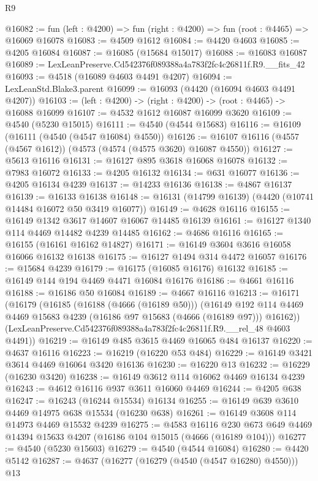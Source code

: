 \begin{lexlean}{R9}
\begin{coremodule}
@16082 := fun (left : @4200) => fun (right : @4200) => fun (root : @4465) => @16069 @16078
@16083 := @4509 @1612
@16084 := @4420 @4603
@16085 := @4205 @16084
@16087 := @16085 (@15684 @15017)
@16088 := @16083 @16087
@16089 := LexLeanPreserve.Cd542376f089388a4a783f2fc4c26811f.R9.__fits_42
@16093 := @4518 (@16089 @4603 @4491 @4207)
@16094 := LexLeanStd.Blake3.parent
@16099 := @16093 (@4420 (@16094 @4603 @4491 @4207))
@16103 := (left : @4200) -> (right : @4200) -> (root : @4465) -> @16088 @16099
@16107 := @4532 @1612 @16087 @16099 @3620
@16109 := @4540 (@5230 @15015)
@16111 := @4540 (@4544 @15683)
@16116 := @16109 (@16111 (@4540 (@4547 @16084) @4550))
@16126 := @16107 @16116 (@4557 (@4567 @1612)) (@4573 (@4574 (@4575 @3620) @16087 @4550))
@16127 := @5613 @16116
@16131 := @16127 @895 @3618 @16068 @16078
@16132 := @7983 @16072
@16133 := @4205 @16132
@16134 := @631 @16077
@16136 := @4205 @16134 @4239
@16137 := @14233 @16136
@16138 := @4867 @16137
@16139 := @16133 @16138
@16148 := @16131 (@14799 @16139) (@4420 (@10741 @14484 @16072 @50 @3419 @16077))
@16149 := @4628 @16116
@16155 := @16149 @1342 @3617 @14607 @16067 @14485 @16139
@16161 := @16127 @1340 @114 @4469 @14482 @4239 @14485
@16162 := @4686 @16116
@16165 := @16155 (@16161 @16162 @14827)
@16171 := @16149 @3604 @3616 @16058 @16066 @16132 @16138
@16175 := @16127 @1494 @314 @4472 @16057
@16176 := @15684 @4239
@16179 := @16175 (@16085 @16176) @16132
@16185 := @16149 @144 @194 @4469 @4471 @16084 @16176
@16186 := @4661 @16116
@16188 := @16186 @50 @16084
@16189 := @4667 @16116
@16213 := @16171
    (@16179
      (@16185
        (@16188 (@4666 (@16189 @50)))
        (@16149 @192 @114 @4469 @4469 @15683 @4239 (@16186 @97 @15683 (@4666 (@16189 @97))) @16162))
      (LexLeanPreserve.Cd542376f089388a4a783f2fc4c26811f.R9.__rel_48 @4603 @4491))
@16219 := @16149 @485 @3615 @4469 @16065 @484 @16137
@16220 := @4637 @16116
@16223 := @16219 (@16220 @53 @484)
@16229 := @16149 @3421 @3614 @4469 @16064 @3420 @16136
@16230 := @16220 @13
@16232 := @16229 (@16230 @3420)
@16238 := @16149 @3612 @114 @16062 @4469 @16134 @4239
@16243 := @4612 @16116 @937 @3611 @16060 @4469
@16244 := @4205 @638
@16247 := @16243 (@16244 @15534) @16134
@16255 := @16149 @639 @3610 @4469 @14975 @638 @15534 (@16230 @638)
@16261 := @16149 @3608 @114 @14973 @4469 @15532 @4239
@16275 := @4583
    @16116
    @230
    @673
    @649
    @4469
    @14394
    @15633
    @4207
    (@16186 @104 @15015 (@4666 (@16189 @104)))
@16277 := @4540 (@5230 @15603)
@16279 := @4540 (@4544 @16084)
@16280 := @4420 @5142
@16287 := @4637 (@16277 (@16279 (@4540 (@4547 @16280) @4550))) @13

\end{coremodule}
\end{lexlean}
